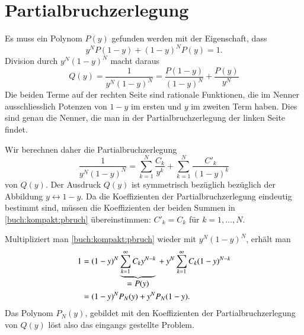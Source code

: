 %
%
%

\section{Partialbruchzerlegung\label{section:partialbruch}}
Es muss ein Polynom $P(y)$ gefunden werden mit der Eigenschaft, dass
\begin{equation}
y^N P(1-y) + (1-y)^N P(y) = 1.
\label{buch:kompakt:bedingung}
\end{equation}
Division durch $y^N(1-y)^N$ macht daraus
\[
Q(y)
=
\frac{1}{y^N(1-y)^N}
=
\frac{P(1-y)}{(1-y)^N}
+
\frac{P(y)}{y^N}
\]
Die beiden Terme auf der rechten Seite sind rationale Funktionen, die im
Nenner ausschliesslich Potenzen von $1-y$ im ersten und $y$ im zweiten
Term haben.
Dies sind genau die Nenner, die man in der Partialbruchzerlegung der linken
Seite findet.

Wir berechnen daher die Partialbruchzerlegung
\begin{equation}
\frac{1}{y^N(1-y)^N}
=
\sum_{k=1}^N\frac{C_k}{y^k}
+
\sum_{k=1}^N\frac{C'_k}{(1-y)^k}
\label{buch:kompakt:pbruch}
\end{equation}
von $Q(y)$.
Der Ausdruck $Q(y)$ ist symmetrisch bezüglich bezüglich der Abbildung
$y\leftrightarrow 1-y$.
Da die Koeffizienten der Partialbruchzerlegung eindeutig bestimmt sind,
müssen die Koeffizienten der beiden Summen in \eqref{buch:kompakt:pbruch}
übereinstimmen: $C'_k=C_k$ für $k=1,\dots,N$.

Multipliziert man \eqref{buch:kompakt:pbruch} wieder mit $y^N(1-y)^N$,
erhält man
\begin{align*}
1
&=
(1-y)^N
\underbrace{\sum_{k=1}^\infty C_k y^{N-k}}_{\displaystyle =P(y)}
\mathstrut
+
y^N
\sum_{k=1}^\infty C_k (1-y)^{N-k}
\\
&=
(1-y)^N
P_N(y)
+
y^N
P_N(1-y).
\end{align*}
Das Polynom $P_N(y)$, gebildet mit den Koeffizienten der Partialbruchzerlegung
von $Q(y)$ löst also das eingangs gestellte Problem.


